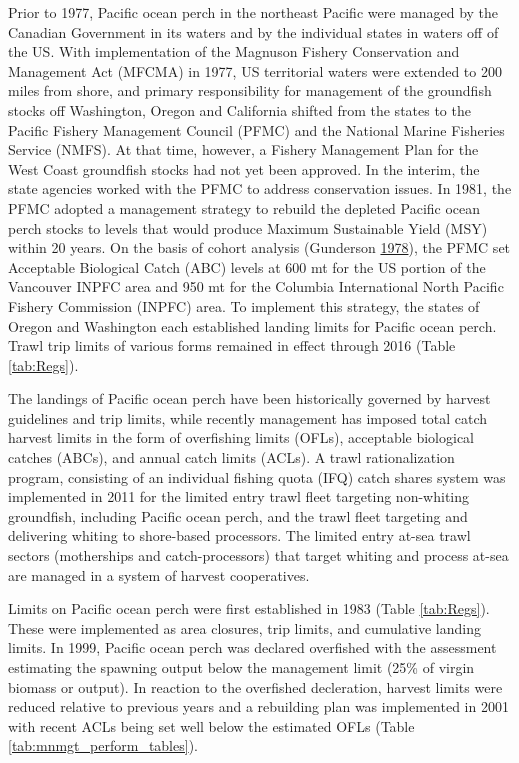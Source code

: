 \documentclass[12pt,]{article}
\begin{document}
Prior to 1977, Pacific ocean perch in the northeast Pacific were managed
by the Canadian Government in its waters and by the individual states in
waters off of the US. With implementation of the Magnuson Fishery
Conservation and Management Act (MFCMA) in 1977, US territorial waters
were extended to 200 miles from shore, and primary responsibility for
management of the groundfish stocks off Washington, Oregon and
California shifted from the states to the Pacific Fishery Management
Council (PFMC) and the National Marine Fisheries Service (NMFS). At that
time, however, a Fishery Management Plan for the West Coast groundfish
stocks had not yet been approved. In the interim, the state agencies
worked with the PFMC to address conservation issues. In 1981, the PFMC
adopted a management strategy to rebuild the depleted Pacific ocean
perch stocks to levels that would produce Maximum Sustainable Yield
(MSY) within 20 years. On the basis of cohort analysis (Gunderson
\protect\hyperlink{ref-gunderson_results_1978}{1978}), the PFMC set
Acceptable Biological Catch (ABC) levels at 600 mt for the US portion of
the Vancouver INPFC area and 950 mt for the Columbia International North
Pacific Fishery Commission (INPFC) area. To implement this strategy, the
states of Oregon and Washington each established landing limits for
Pacific ocean perch. Trawl trip limits of various forms remained in
effect through 2016 (Table \ref{tab:Regs}).

The landings of Pacific ocean perch have been historically governed by
harvest guidelines and trip limits, while recently management has
imposed total catch harvest limits in the form of overfishing limits
(OFLs), acceptable biological catches (ABCs), and annual catch limits
(ACLs). A trawl rationalization program, consisting of an individual
fishing quota (IFQ) catch shares system was implemented in 2011 for the
limited entry trawl fleet targeting non-whiting groundfish, including
Pacific ocean perch, and the trawl fleet targeting and delivering
whiting to shore-based processors. The limited entry at-sea trawl
sectors (motherships and catch-processors) that target whiting and
process at-sea are managed in a system of harvest cooperatives.

Limits on Pacific ocean perch were first established in 1983 (Table
\ref{tab:Regs}). These were implemented as area closures, trip limits,
and cumulative landing limits. In 1999, Pacific ocean perch was declared
overfished with the assessment estimating the spawning output below the
management limit (25\% of virgin biomass or output). In reaction to the
overfished decleration, harvest limits were reduced relative to previous
years and a rebuilding plan was implemented in 2001 with recent ACLs
being set well below the estimated OFLs (Table
\ref{tab:mnmgt_perform_tables}).
\end{document}
